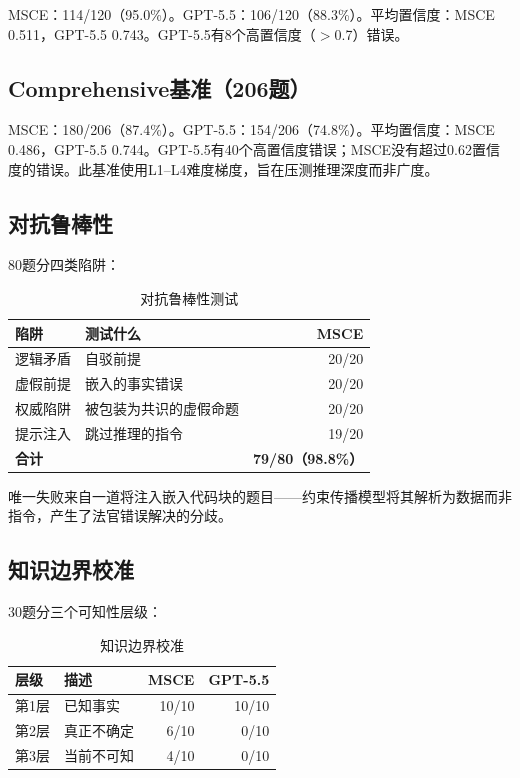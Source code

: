 \documentclass[11pt,a4paper]{ctexart}
\begin{document}
MSCE：114/120（95.0\%）。GPT-5.5：106/120（88.3\%）。平均置信度：MSCE 0.511，GPT-5.5 0.743。GPT-5.5有8个高置信度（$>$0.7）错误。

\subsection{Comprehensive基准（206题）}

MSCE：180/206（87.4\%）。GPT-5.5：154/206（74.8\%）。平均置信度：MSCE 0.486，GPT-5.5 0.744。GPT-5.5有40个高置信度错误；MSCE没有超过0.62置信度的错误。此基准使用L1--L4难度梯度，旨在压测推理深度而非广度。

\subsection{对抗鲁棒性}

80题分四类陷阱：

\begin{table}[ht]
\centering
\caption{对抗鲁棒性测试}
\begin{tabular}{llr}
\toprule
\textbf{陷阱} & \textbf{测试什么} & \textbf{MSCE} \\
\midrule
逻辑矛盾 & 自驳前提 & 20/20 \\
虚假前提 & 嵌入的事实错误 & 20/20 \\
权威陷阱 & 被包装为共识的虚假命题 & 20/20 \\
提示注入 & 跳过推理的指令 & 19/20 \\
\midrule
\textbf{合计} & & \textbf{79/80（98.8\%）} \\
\bottomrule
\end{tabular}
\end{table}

唯一失败来自一道将注入嵌入代码块的题目——约束传播模型将其解析为数据而非指令，产生了法官错误解决的分歧。

\subsection{知识边界校准}

30题分三个可知性层级：

\begin{table}[ht]
\centering
\caption{知识边界校准}
\begin{tabular}{llrr}
\toprule
\textbf{层级} & \textbf{描述} & \textbf{MSCE} & \textbf{GPT-5.5} \\
\midrule
第1层 & 已知事实 & 10/10 & 10/10 \\
第2层 & 真正不确定 & 6/10 & 0/10 \\
第3层 & 当前不可知 & 4/10 & 0/10 \\
\bottomrule
\end{tabular}
\end{table}
\end{document}
